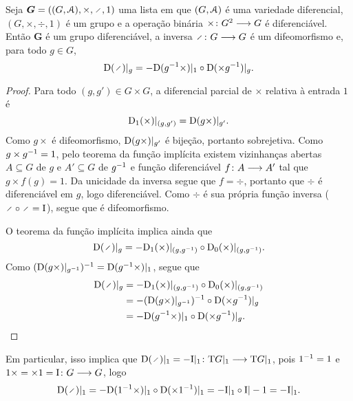 \begin{proposition}
Seja $\bm G = ((G,\atlas),\times,\div,1)$ uma lista em que $(G,\mathcal{A})$ é uma variedade diferencial, $(G,\times,\div,1)$ é um grupo e a operação binária ${\times}\colon {G^2} \longrightarrow {G}$ é diferenciável. Então $\bm G$ é um grupo diferenciável, a inversa $\fun{\div}{G}{G}$ é um difeomorfismo e, para todo $g \in G$,
	\begin{equation*}
	\D (\div)|_g = - \D (g\inv \times)|_{1} \circ \D (\times g\inv)|_g.
	\end{equation*}
\end{proposition}
\begin{proof}
Para todo $(g,g') \in G \times G$, a diferencial parcial de $\times$ relativa à entrada $1$ é
	\begin{equation*}
	\mathrm{D}_1(\times)|_{(g,g')} = \mathrm{D} (g \times)|_{g'}.
	\end{equation*}
Como $g\times$ é difeomorfismo, $\mathrm{D} (g \times)|_{g'}$ é bijeção, portanto sobrejetiva. Como $g \times g^{-1} = 1$, pelo teorema da função implícita existem vizinhanças abertas $A \subseteq G$ de $g$ e $A' \subseteq G$ de $g^{-1}$ e função diferenciável ${f}\colon {A} \longrightarrow {A'}$ tal que $g \times f(g) = 1$. Da unicidade da inversa segue que $f=\div$, portanto que $\div$ é diferenciável em $g$, logo diferenciável. Como $\div$ é sua própria função inversa ($\div \circ \div = \Id$), segue que é difeomorfismo.

O teorema da função implícita implica ainda que
	\begin{equation*}
	\D(\div)|_g = - \D_1(\times)|_{(g,g\inv)} \circ \D_0(\times)|_{(g,g\inv)}.
	\end{equation*}
Como $(\mathrm{D} (g \times)|_{g^{-1}})^{-1} = \mathrm{D} (g^{-1} \times)|_{1}$, segue que
	\begin{align*}
	\D(\div)|_g &= - \D_1(\times)|_{(g,g\inv)} \circ \D_0(\times)|_{(g,g\inv)} \\
		&= - (\D (g \times)|_{g\inv})\inv \circ \D (\times g\inv)|_{g} \\
		&= - \D (g\inv \times)|_{1} \circ \D (\times g\inv)|_g.
	\end{align*}
\end{proof}

Em particular, isso implica que $\D(\div)|_1 = \fun{-\Id|_1}{\Tg G|_1}{\Tg G|_1}$, pois $1^{-1}=1$ e $1\times = \times 1 = {\mathrm{I}}\colon {G} \longrightarrow {G}$, logo
	\begin{equation*}
	\D (\div)|_1 = - \D (1\inv \times)|_{1} \circ \D (\times 1\inv)|_1 = -\Id|_1 \circ \Id|-1 = - \Id|_1.
	\end{equation*}




